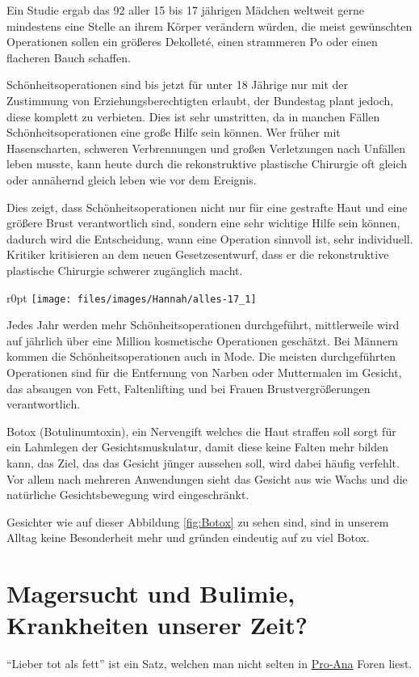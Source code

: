 Ein Studie ergab das 92\Prozent{} aller 15 bis 17 jährigen Mädchen weltweit
gerne mindestens eine Stelle an ihrem
Körper verändern würden, die meist gewünschten Operationen sollen ein größeres Dekolleté,
einen strammeren Po oder einen flacheren Bauch schaffen.

Schönheitsoperationen sind bis jetzt für unter 18 Jährige nur mit der Zustimmung von
Erziehungsberechtigten erlaubt, der Bundestag plant jedoch, diese komplett zu verbieten. Dies ist
sehr umstritten, da in manchen Fällen Schönheitsoperationen eine große Hilfe sein können. Wer früher
mit Hasenscharten, schweren Verbrennungen und großen Verletzungen nach Unfällen leben musste, kann
heute durch die rekonstruktive plastische Chirurgie oft gleich oder annähernd gleich leben wie vor
dem Ereignis.

Dies zeigt, dass Schönheitsoperationen nicht nur für eine gestrafte Haut und eine größere Brust
verantwortlich sind, sondern eine sehr wichtige Hilfe sein können, dadurch wird die Entscheidung,
wann eine Operation sinnvoll ist, sehr individuell. Kritiker kritisieren an dem neuen
Gesetzesentwurf, dass er die rekonstruktive plastische Chirurgie schwerer zugänglich macht.

\begin{wrapfigure}{r}{0pt}
	\texttt{[image: files/images/Hannah/alles-17\_1]}%
	\label{fig:Botox}
\end{wrapfigure}
Jedes Jahr werden mehr Schönheitsoperationen durchgeführt, mittlerweile wird auf jährlich über eine
Million kosmetische Operationen geschätzt. Bei Männern kommen die Schönheitsoperationen auch in Mode.
Die meisten durchgeführten Operationen sind für die Entfernung von Narben oder Muttermalen im
Gesicht, das absaugen von Fett, Faltenlifting und bei Frauen Brustvergrößerungen verantwortlich.

Botox (Botulinumtoxin), ein Nervengift welches die Haut straffen soll sorgt für ein Lahmlegen der
Gesichtsmuskulatur, damit diese keine Falten mehr bilden kann, das Ziel, das das Gesicht jünger
aussehen soll, wird dabei häufig verfehlt. Vor allem nach mehreren Anwendungen sieht das Gesicht aus
wie Wachs und die natürliche Gesichtsbewegung wird eingeschränkt.

Gesichter wie auf dieser Abbildung \vref{fig:Botox} zu sehen sind, sind in unserem Alltag
keine Besonderheit mehr und gründen eindeutig auf zu viel Botox.

\section{Magersucht und Bulimie, Krankheiten unserer Zeit?}
\enquote{Lieber tot als fett} ist ein Satz, welchen man nicht selten in
\href{http://de.wikipedia.org/wiki/Pro-Ana}{Pro-Ana} Foren liest.

